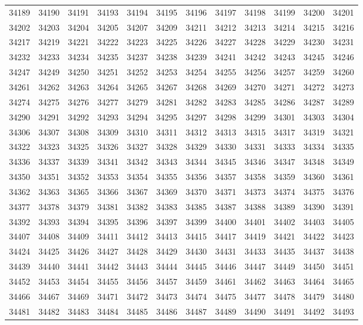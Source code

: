 \begin{center}
\begin{longtable}{llllllllllll}
34189 &34190 &34191 &34193 &34194 &34195 &34196 &34197 &34198 &34199 &34200 &34201 \\
34202 &34203 &34204 &34205 &34207 &34209 &34211 &34212 &34213 &34214 &34215 &34216 \\
34217 &34219 &34221 &34222 &34223 &34225 &34226 &34227 &34228 &34229 &34230 &34231 \\
34232 &34233 &34234 &34235 &34237 &34238 &34239 &34241 &34242 &34243 &34245 &34246 \\
34247 &34249 &34250 &34251 &34252 &34253 &34254 &34255 &34256 &34257 &34259 &34260 \\
34261 &34262 &34263 &34264 &34265 &34267 &34268 &34269 &34270 &34271 &34272 &34273 \\
34274 &34275 &34276 &34277 &34279 &34281 &34282 &34283 &34285 &34286 &34287 &34289 \\
34290 &34291 &34292 &34293 &34294 &34295 &34297 &34298 &34299 &34301 &34303 &34304 \\
34306 &34307 &34308 &34309 &34310 &34311 &34312 &34313 &34315 &34317 &34319 &34321 \\
34322 &34323 &34325 &34326 &34327 &34328 &34329 &34330 &34331 &34333 &34334 &34335 \\
34336 &34337 &34339 &34341 &34342 &34343 &34344 &34345 &34346 &34347 &34348 &34349 \\
34350 &34351 &34352 &34353 &34354 &34355 &34356 &34357 &34358 &34359 &34360 &34361 \\
34362 &34363 &34365 &34366 &34367 &34369 &34370 &34371 &34373 &34374 &34375 &34376 \\
34377 &34378 &34379 &34381 &34382 &34383 &34385 &34387 &34388 &34389 &34390 &34391 \\
34392 &34393 &34394 &34395 &34396 &34397 &34399 &34400 &34401 &34402 &34403 &34405 \\
34407 &34408 &34409 &34411 &34412 &34413 &34415 &34417 &34419 &34421 &34422 &34423 \\
34424 &34425 &34426 &34427 &34428 &34429 &34430 &34431 &34433 &34435 &34437 &34438 \\
34439 &34440 &34441 &34442 &34443 &34444 &34445 &34446 &34447 &34449 &34450 &34451 \\
34452 &34453 &34454 &34455 &34456 &34457 &34459 &34461 &34462 &34463 &34464 &34465 \\
34466 &34467 &34469 &34471 &34472 &34473 &34474 &34475 &34477 &34478 &34479 &34480 \\
34481 &34482 &34483 &34484 &34485 &34486 &34487 &34489 &34490 &34491 &34492 &34493 \\

\end{longtable}
\end{center}
